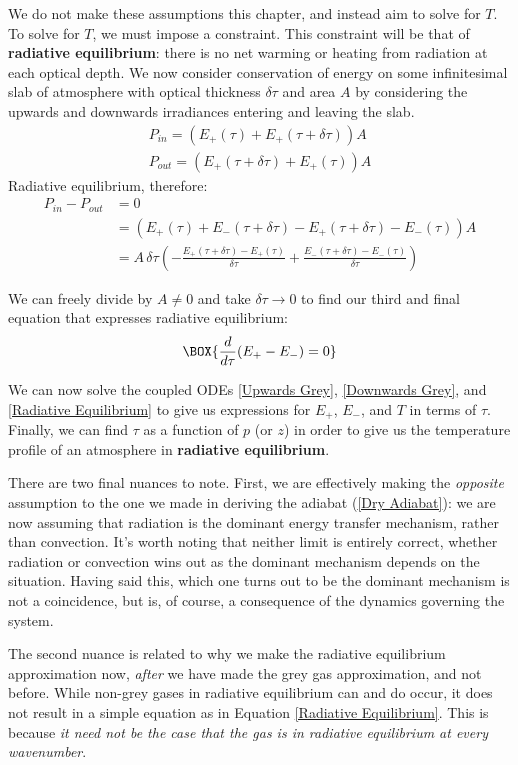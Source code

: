 We do not make these assumptions this chapter, and instead aim to solve for $T$. To solve for $T$, we must impose a constraint. This constraint will be that of \textbf{radiative equilibrium}: there is no net warming or heating from radiation at each optical depth. We now consider conservation of energy on some infinitesimal slab of atmosphere with optical thickness $\delta \tau$ and area $A$ by considering the upwards and downwards irradiances entering and leaving the slab. 
\begin{align*}
    P_{in}=(E_+(\tau)+E_+(\tau+\delta\tau))A\\
    P_{out}=(E_+(\tau+\delta\tau)+E_+(\tau))A
\end{align*}
Radiative equilibrium, therefore:
\begin{align*}
    P_{in}-P_{out}&=0\\
    &= (E_+(\tau)+E_-(\tau+\delta\tau)-E_+(\tau+\delta\tau)-E_-(\tau))A\\
    &=A\,\delta\tau
    \left(-
    \frac{E_+(\tau+\delta\tau)-E_+(\tau)}{\delta \tau}
    +
    \frac{E_-(\tau+\delta\tau)-E_-(\tau)}{\delta \tau}
    \right)
\end{align*}

We can freely divide by $A\neq0$ and take $\delta\tau\to0$ to find our third and final equation that expresses radiative equilibrium:
\begin{align}\label{Radiative Equilibrium}
    \BOX{\frac{d}{d\tau}(E_+-E_-)=0}
\end{align}

We can now solve the coupled ODEs \ref{Upwards Grey}, \ref{Downwards Grey}, and \ref{Radiative Equilibrium} to give us expressions for $E_+$, $E_-$, and $T$ in terms of $\tau$. Finally, we can find $\tau$ as a function of $p$ (or $z$) in order to give us the temperature profile of an atmosphere in \textbf{radiative equilibrium}. 

There are two final nuances to note. First, we are effectively making the \textit{opposite} assumption to the one we made in deriving the adiabat (\ref{Dry Adiabat}): we are now assuming that radiation is the dominant energy transfer mechanism, rather than convection. It's worth noting that neither limit is entirely correct, whether radiation or convection wins out as the dominant mechanism depends on the situation. Having said this, which one turns out to be the dominant mechanism is not a coincidence, but is, of course, a consequence of the dynamics governing the system.

The second nuance is related to why we make the radiative equilibrium approximation now, \textit{after} we have made the grey gas approximation, and not before. While non-grey gases in radiative equilibrium can and do occur, it does not result in a simple equation as in Equation \ref{Radiative Equilibrium}. This is because \textit{it need not be the case that the gas is in radiative equilibrium at every wavenumber}. 

